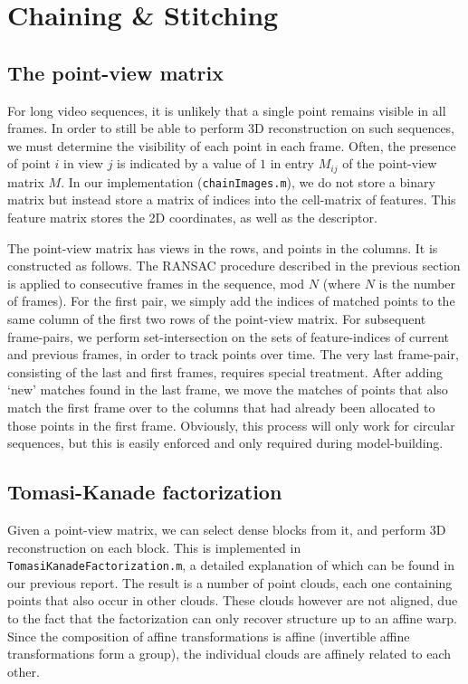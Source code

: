 \documentclass[a4paper,10pt]{article}
\begin{document}
\section{Chaining \& Stitching}
\subsection{The point-view matrix}
For long video sequences, it is unlikely that a single point remains visible in all frames.
In order to still be able to perform 3D reconstruction on such sequences, we must determine the visibility of each point in each frame.
Often, the presence of point $i$ in view $j$ is indicated by a value of $1$ in entry $M_{ij}$ of the point-view matrix $M$.
In our implementation (\verb+chainImages.m+), we do not store a binary matrix but instead store a matrix of indices into the cell-matrix of features.
This feature matrix stores the 2D coordinates, as well as the descriptor.

The point-view matrix has views in the rows, and points in the columns.
It is constructed as follows.
The RANSAC procedure described in the previous section is applied to consecutive frames in the sequence, mod $N$ (where $N$ is the number of frames).
For the first pair, we simply add the indices of matched points to the same column of the first two rows of the point-view matrix.
For subsequent frame-pairs, we perform set-intersection on the sets of feature-indices of current and previous frames, in order to track points over time.
The very last frame-pair, consisting of the last and first frames, requires special treatment.
After adding `new' matches found in the last frame, we move the matches of points that also match the first frame over to the columns that had already been allocated to those points in the first frame.
Obviously, this process will only work for circular sequences, but this is easily enforced and only required during model-building.

\subsection{Tomasi-Kanade factorization}
Given a point-view matrix, we can select dense blocks from it, and perform 3D reconstruction on each block.
This is implemented in \verb+TomasiKanadeFactorization.m+, a detailed explanation of which can be found in our previous report.
The result is a number of point clouds, each one containing points that also occur in other clouds.
These clouds however are not aligned, due to the fact that the factorization can only recover structure up to an affine warp.
Since the composition of affine transformations is affine (invertible affine transformations form a group), the individual clouds are affinely related to each other.
\end{document}

